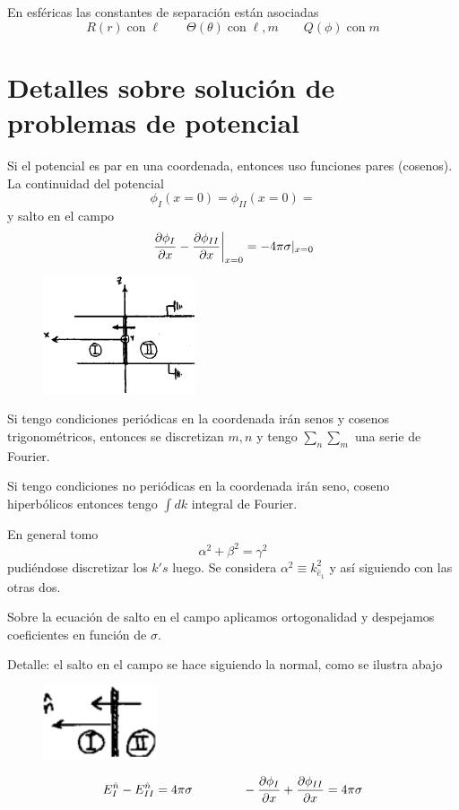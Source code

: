 \documentclass[10pt,oneside]{CBFT_book}
\begin{document}
En esféricas las constantes de separación están asociadas
\[
	R(r) \; \mathrm{con} \; \ell \qquad \Theta(\theta) \; \mathrm{con} \; \ell,m \qquad
	Q(\phi) \; \mathrm{con} \; m
\]

\section{Detalles sobre solución de problemas de potencial}

Si el potencial es par en una coordenada, entonces uso funciones pares (cosenos). 
La continuidad del potencial
\[
	\phi_I(x=0) = \phi_{II}(x=0) = 
\]
y salto en el campo
\[
	\left.\frac{\partial^{\hspace{-0.05em}} {\phi_I}}{\partial {x}^{\hspace{-0.05em}}} - \frac{\partial^{\hspace{-0.05em}} {\phi_{II}}}{\partial {x}^{\hspace{-0.05em}}}\right|_{x=0} = -4\pi\sigma|_{x=0}
\]

\begin{figure}[htb]
	\begin{center}
	\includegraphics[width=0.4\textwidth]{images/fig_ft1_potencial.pdf}	 
	\end{center}
	\caption{}
\end{figure} 
Si tengo condiciones periódicas en la coordenada irán senos y cosenos trigonométricos, entonces se
discretizan $m,n$ y tengo $\sum_n \sum_m$ una serie de Fourier.

Si tengo condiciones no periódicas en la coordenada irán seno, coseno hiperbólicos entonces tengo
$\int dk$ integral de Fourier.

En general tomo
\[
	\alpha^2 + \beta^2 = \gamma^2
\]
pudiéndose discretizar los $k's$ luego. Se considera $\alpha^2 \equiv k_{\hat{e}_1}^2$ y así siguiendo
con las otras dos.

Sobre la ecuación de salto en el campo aplicamos ortogonalidad y despejamos coeficientes en función
de $\sigma$.

Detalle: el salto en el campo se hace siguiendo la normal, como se ilustra abajo
\begin{figure}[htb]
	\begin{center}
	\includegraphics[width=0.3\textwidth]{images/fig_ft1_potencialsketch.pdf}
	\end{center}
	\caption{}
\end{figure} 
\[
	E_I^{\hat{n}} - E_{II}^{\hat{n}} = 4 \pi \sigma \qquad\qquad 
	- \frac{\partial^{\hspace{-0.05em}} {\phi_I}}{\partial {x}^{\hspace{-0.05em}}} + \frac{\partial^{\hspace{-0.05em}} {\phi_{II}}}{\partial {x}^{\hspace{-0.05em}}} = 4 \pi \sigma
\]
\end{document}
